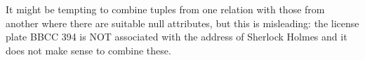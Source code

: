 It might be tempting to combine tuples from one relation with those from another where there are suitable null attributes, but this is misleading: the license plate BBCC 394 is NOT associated with the address of Sherlock Holmes and it does not make sense to combine these.




